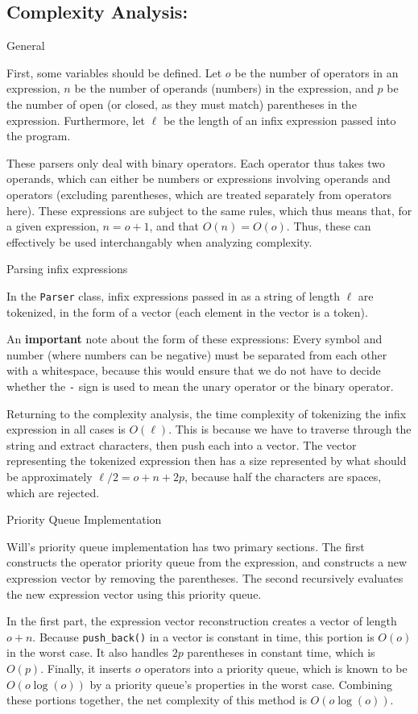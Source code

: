 \documentclass[11pt]{article}
\begin{document}
\subsection*{Complexity Analysis:}

\centerline{General}
First, some variables should be defined.
Let $o$ be the number of operators in an expression, $n$ be the number of operands (numbers) in the expression, and $p$ be the number of open (or closed, as they must match) parentheses in the expression. Furthermore, let $\ell$ be the length of an infix expression passed into the program.

These parsers only deal with binary operators. Each operator thus takes two operands, which can either be numbers or expressions involving operands and operators (excluding parentheses, which are treated separately from operators here).
These expressions are subject to the same rules, which thus means that, for a given expression, $n=o+1$, and that $O(n)=O(o)$.
Thus, these can effectively be used interchangably when analyzing complexity.

\centerline{Parsing infix expressions}
In the \texttt{Parser} class, infix expressions passed in as a string of length $\ell$ are tokenized, in the form of a vector (each element in the vector is a token).

An \textbf{important} note about the form of these expressions: Every symbol and number (where numbers can be negative) must be separated from each other with a whitespace, because this would ensure that we do not have to decide whether the \texttt{-} sign is used to mean the unary operator or the binary operator.

Returning to the complexity analysis, the time complexity of tokenizing the infix expression in all cases is $O(\ell)$.
This is because we have to traverse through the string and extract characters, then push each into a vector.
The vector representing the tokenized expression then has a size represented by what should be approximately $\ell / 2 = o + n + 2p$, because half the characters are spaces, which are rejected.

\centerline{Priority Queue Implementation}
Will's priority queue implementation has two primary sections.
The first constructs the operator priority queue from the expression, and constructs a new expression vector by removing the parentheses.
The second recursively evaluates the new expression vector using this priority queue.

In the first part, the expression vector reconstruction creates a vector of length $o + n$.
Because \texttt{push\_back()} in a vector is constant in time, this portion is $O(o)$ in the worst case.
It also handles $2p$ parentheses in constant time, which is $O(p)$.
Finally, it inserts $o$ operators into a priority queue, which is known to be $O(o\log(o))$ by a priority queue's properties in the worst case.
Combining these portions together, the net complexity of this method is $O(o\log(o))$.
\end{document}
